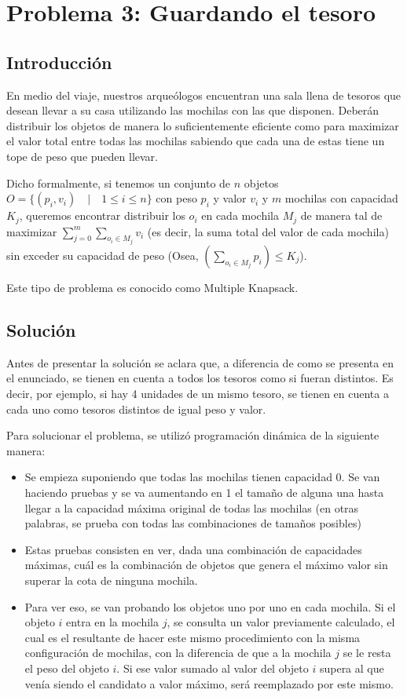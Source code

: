 \section{Problema 3: Guardando el tesoro}

\subsection{Introducción}

En medio del viaje, nuestros arqueólogos encuentran una sala llena de tesoros que desean llevar a su casa utilizando las mochilas con las que disponen. Deberán distribuir los objetos de manera lo suficientemente eficiente como para maximizar el valor total entre todas las mochilas sabiendo que cada una de estas tiene un tope de peso que pueden llevar.

Dicho formalmente, si tenemos un conjunto de $n$ objetos $O = \{(p_i,v_i) \quad | \quad 1 \leq i \leq n\}$ con peso $p_i$ y valor $v_i$ y $m$ mochilas con capacidad $K_j$, queremos encontrar distribuir los $o_i$ en cada mochila $M_j$ de manera tal de maximizar $\sum_{j = 0}^m\sum_{o_i \in M_j} v_i$ (es decir, la suma total del valor de cada mochila) sin exceder su capacidad de peso (Osea, $(\sum_{o_i \in M_j} p_i) \leq K_j$).

Este tipo de problema es conocido como Multiple Knapsack.

\subsection{Solución}

Antes de presentar la solución se aclara que, a diferencia de como se presenta en el enunciado, se tienen en cuenta a todos los tesoros como si fueran distintos. Es decir, por ejemplo, si hay 4 unidades de un mismo tesoro, se tienen en cuenta a cada uno como tesoros distintos de igual peso y valor.

Para solucionar el problema, se utilizó programación dinámica de la siguiente manera:

\begin{itemize}
\item Se empieza suponiendo que todas las mochilas tienen capacidad 0. Se van haciendo pruebas y se va aumentando en 1 el tamaño de alguna una hasta llegar a la capacidad máxima original de todas las mochilas (en otras palabras, se prueba con todas las combinaciones de tamaños posibles)
\item Estas pruebas consisten en ver, dada una combinación de capacidades máximas, cuál es la combinación de objetos que genera el máximo valor sin superar la cota de ninguna mochila.
\item Para ver eso, se van probando los objetos uno por uno en cada mochila. Si el objeto $i$ entra en la mochila $j$, se consulta un valor previamente calculado, el cual es el resultante de hacer este mismo procedimiento con la misma configuración de mochilas, con la diferencia de que a la mochila $j$ se le resta el peso del objeto $i$. Si ese valor sumado al valor del objeto $i$ supera al que venía siendo el candidato a valor máximo, será reemplazado por este mismo.
\end{itemize}

